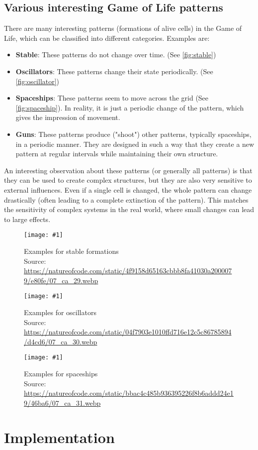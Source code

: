 \documentclass[a4paper,12pt]{llncs}
\numberwithin{equation}{section}
\newcommand{\imagewithwidth}[5]{
  \begin{figure}[htbp]%
    \begin{center}%
      \texttt{[image: \#1]}%
      \caption[#5]{#4}%
      \label{#3}%
    \end{center}%
  \end{figure}
}
\begin{document}
\subsection{Various interesting Game of Life patterns}
There are many interesting patterns (formations of alive cells) in the Game of Life, which can be classified into different categories. Examples are:
\begin{itemize}
  \item \textbf{Stable}: These patterns do not change over time. (See \autoref{fig:stable})
  \item \textbf{Oscillators}: These patterns change their state periodically. (See \autoref{fig:oscillator})
  \item \textbf{Spaceships}: These patterns seem to move across the grid (See \autoref{fig:spaceship}). In reality, it is just a periodic change of the pattern, which gives the impression of movement.
  \item \textbf{Guns}: These patterns produce ("shoot") other patterns, typically spaceships, in a periodic manner. They are designed in such a way that they create a new pattern at regular intervals while maintaining their own structure.
\end{itemize}
An interesting observation about these patterns (or generally all patterns) is that they can be used to create complex structures,
but they are also very sensitive to external influences. Even if a single cell is changed, the whole pattern can change drastically (often leading to a complete extinction of the pattern).
This matches the sensitivity of complex systems in the real world, where small changes can lead to large effects.
\imagewithwidth{figures/stable}{0.7\textwidth}{fig:stable}{Examples for stable formations\\Source: \url{https://natureofcode.com/static/4f9158d65163cbbb8fa41030a2000079/e80fe/07_ca_29.webp}}{}
\imagewithwidth{figures/oscillator}{0.7\textwidth}{fig:oscillator}{Examples for oscillators\\Source: \url{https://natureofcode.com/static/04f7903e1010ffd716e12c5c86785894/d4cd6/07_ca_30.webp}}{}
\imagewithwidth{figures/spaceship}{0.7\textwidth}{fig:spaceship}{Examples for spaceships\\Source: \url{https://natureofcode.com/static/bbac4c485b936395226f8b6addd24e19/46ba6/07_ca_31.webp}}{}

\section{Implementation}
\end{document}
